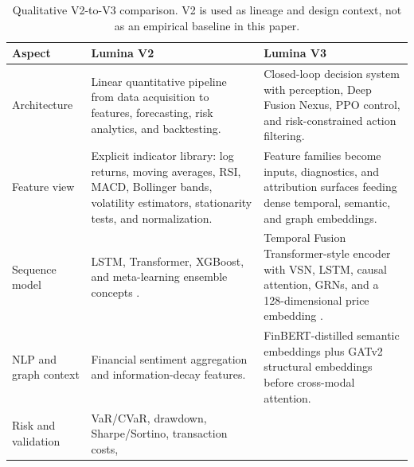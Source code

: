 \documentclass[10pt]{article}
\begin{document}
\begin{table}[htbp]
	\centering
	\small
	\caption{Qualitative V2-to-V3 comparison. V2 is used as lineage and design context, not as
		an empirical baseline in this paper.}
	\label{tab:v2-v3}
	\begin{tabularx}{\textwidth}{p{}XX}
		\toprule
		Aspect                                                                               & Lumina V2                                                            & Lumina V3 \\
		\midrule
		Architecture                                                                         & Linear quantitative pipeline from data acquisition to features,
		forecasting, risk analytics, and backtesting.                                        & Closed-loop decision system with
		perception, Deep Fusion Nexus, PPO control, and risk-constrained action filtering.                                                                                      \\
		Feature view                                                                         & Explicit indicator library: log returns, moving averages, RSI, MACD,
		Bollinger bands, volatility estimators, stationarity tests, and normalization.       & Feature
		families become inputs, diagnostics, and attribution surfaces feeding dense temporal,
		semantic, and graph embeddings.                                                                                                                                         \\
		Sequence model                                                                       & LSTM, Transformer, XGBoost, and meta-learning ensemble concepts
		\cite{hochreiter1997,vaswani2017}.                                                   & Temporal Fusion Transformer-style encoder with VSN,
		LSTM, causal attention, GRNs, and a 128-dimensional price embedding \cite{lim2021}.                                                                                     \\
		NLP and graph context                                                                & Financial sentiment aggregation and information-decay features.      &
		FinBERT-distilled semantic embeddings plus GATv2 structural embeddings before cross-modal
		attention.                                                                                                                                                              \\
		Risk and validation                                                                  & VaR/CVaR, drawdown, Sharpe/Sortino, transaction costs,

\end{tabularx}
\end{table}
\end{document}
